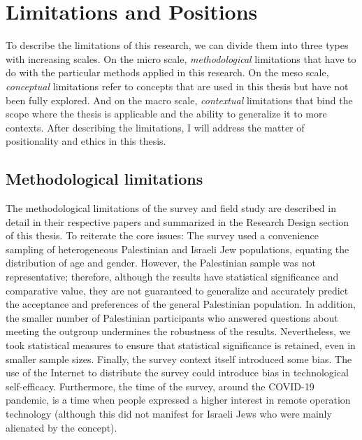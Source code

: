 \documentclass[dissertation,math,vertlayout,pdfa,colorlinks]{aaltoseries}
\begin{document}
\section{Limitations and Positions}
To describe the limitations of this research, we can divide them into three types with increasing scales. On the micro scale, \textit{methodological} limitations that have to do with the particular methods applied in this research. On the meso scale, \textit{conceptual} limitations refer to concepts that are used in this thesis but have not been fully explored. And on the macro scale, \textit{contextual} limitations that bind the scope where the thesis is applicable and the ability to generalize it to more contexts. After describing the limitations, I will address the matter of positionality and ethics in this thesis.

\subsection{Methodological limitations}
The methodological limitations of the survey and field study are described in detail in their respective papers and summarized in the Research Design section of this thesis. To reiterate the core issues: The survey used a convenience sampling of heterogeneous Palestinian and Israeli Jew populations, equating the distribution of age and gender. However, the Palestinian sample was not representative; therefore, although the results have statistical significance and comparative value, they are not guaranteed to generalize and accurately predict the acceptance and preferences of the general Palestinian population. In addition, the smaller number of Palestinian participants who answered questions about meeting the outgroup undermines the robustness of the results. Nevertheless, we took statistical measures to ensure that statistical significance is retained, even in smaller sample sizes. Finally, the survey context itself introduced some bias. The use of the Internet to distribute the survey could introduce bias in technological self-efficacy. Furthermore, the time of the survey, around the COVID-19 pandemic, is a time when people expressed a higher interest in remote operation technology (although this did not manifest for Israeli Jews who were mainly alienated by the concept).
\end{document}
